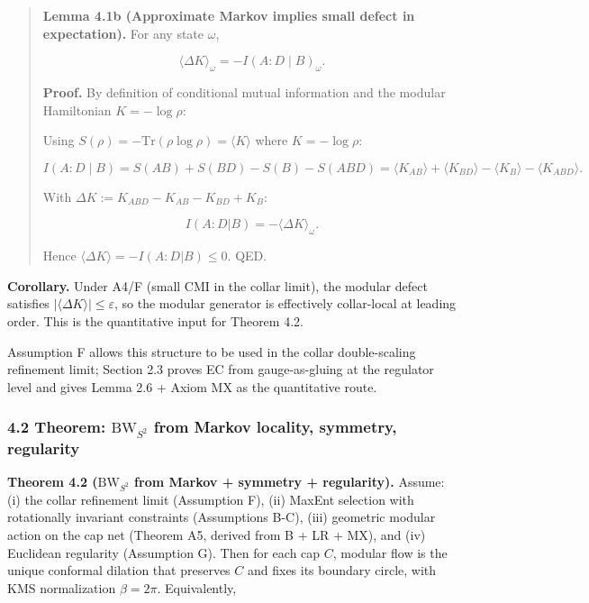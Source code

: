 \begin{quote}
\textbf{Lemma 4.1b (Approximate Markov implies small defect in expectation).} For any state \(\omega\),

\[
\langle \Delta K \rangle_\omega = -I(A:D \mid B)_\omega.
\]

\textbf{Proof.} By definition of conditional mutual information and the modular Hamiltonian \(K = -\log \rho\):

Using \(S(\rho) = -\mathrm{Tr}(\rho \log \rho) = \langle K \rangle\) where \(K = -\log \rho\):

\[
I(A:D \mid B) = S(AB) + S(BD) - S(B) - S(ABD)
= \langle K_{AB} \rangle + \langle K_{BD} \rangle - \langle K_B \rangle - \langle K_{ABD} \rangle.
\]

With \(\Delta K := K_{ABD} - K_{AB} - K_{BD} + K_B\):

\[
I(A:D|B) = -\langle \Delta K \rangle_\omega.
\]

Hence \(\langle \Delta K \rangle = -I(A:D|B) \le 0\). QED.
\end{quote}

\textbf{Corollary.} Under A4/F (small CMI in the collar limit), the modular defect satisfies \(|\langle \Delta K \rangle| \le \varepsilon\), so the modular generator is effectively collar-local at leading order. This is the quantitative input for Theorem 4.2.

Assumption F allows this structure to be used in the collar double-scaling refinement limit; Section 2.3 proves EC from gauge-as-gluing at the regulator level and gives Lemma 2.6 + Axiom MX as the quantitative route.

\subsubsection{\texorpdfstring{4.2 Theorem: \(\mathrm{BW}_{S^2}\) from Markov locality, symmetry, regularity}{4.2 Theorem: \textbackslash mathrm\{BW\}\_\{S\^{}2\} from Markov locality, symmetry, regularity}}\label{42-theorem-mathrmbw_s2-from-markov-locality-symmetry-regularity}

\textbf{Theorem 4.2 (\(\mathrm{BW}_{S^2}\) from Markov + symmetry + regularity).} Assume: (i) the collar refinement limit (Assumption F), (ii) MaxEnt selection with rotationally invariant constraints (Assumptions B-C), (iii) geometric modular action on the cap net (Theorem A5, derived from B + LR + MX), and (iv) Euclidean regularity (Assumption G). Then for each cap \(C\), modular flow is the unique conformal dilation that preserves \(C\) and fixes its boundary circle, with KMS normalization \(\beta = 2\pi\). Equivalently,


